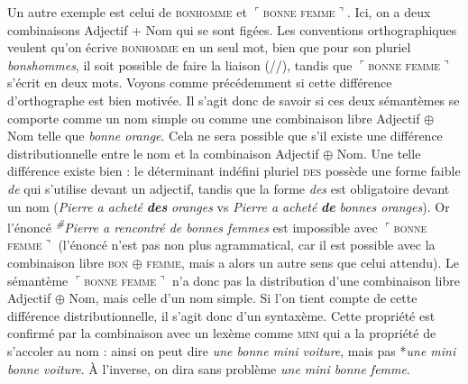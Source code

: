 Un autre exemple est celui de \textsc{bonhomme} et $⌜$\textsc{bonne} \textsc{femme}$⌝$. Ici, on a deux combinaisons Adjectif + Nom qui se sont figées. Les conventions orthographiques veulent qu’on écrive \textsc{bonhomme} en un seul mot, bien que pour son pluriel \textit{bonshommes}, il soit possible de faire la liaison (//), tandis que $⌜$\textsc{bonne} \textsc{femme}$⌝$ s’écrit en deux mots. Voyons comme précédemment si cette différence d’orthographe est bien motivée. Il s’agit donc de savoir si ces deux sémantèmes se comporte comme un nom simple ou comme une combinaison libre Adjectif ${\oplus}$ Nom telle que \textit{bonne orange}. Cela ne sera possible que s’il existe une différence distributionnelle entre le nom et la combinaison Adjectif ${\oplus}$ Nom. Une telle différence existe bien : le déterminant indéfini pluriel \textsc{des} possède une forme faible \textit{de} qui s’utilise devant un adjectif, tandis que la forme \textit{des} est obligatoire devant un nom (\textit{Pierre a acheté} \textbf{\textit{des}} \textit{oranges} vs \textit{Pierre a acheté} \textbf{\textit{de}} \textit{bonnes oranges}). Or l’énoncé \textit{\textsuperscript{\#}}\textit{Pierre a rencontré de bonnes femmes} est impossible avec $⌜$\textsc{bonne} \textsc{femme}$⌝$ (l’énoncé n’est pas non plus agrammatical, car il est possible avec la combinaison libre \textsc{bon} ${\oplus}$ \textsc{femme}, mais a alors un autre sens que celui attendu). Le sémantème $⌜$\textsc{bonne} \textsc{femme}$⌝$ n’a donc pas la distribution d’une combinaison libre Adjectif ${\oplus}$ Nom, mais celle d’un nom simple. Si l’on tient compte de cette différence distributionnelle, il s’agit donc d’un syntaxème. Cette propriété est confirmé par la combinaison avec un lexème comme \textsc{mini} qui a la propriété de s’accoler au nom : ainsi on peut dire \textit{une bonne mini voiture}, mais pas *\textit{une mini bonne voiture}. À l’inverse, on dira sans problème \textit{une mini bonne femme}.

